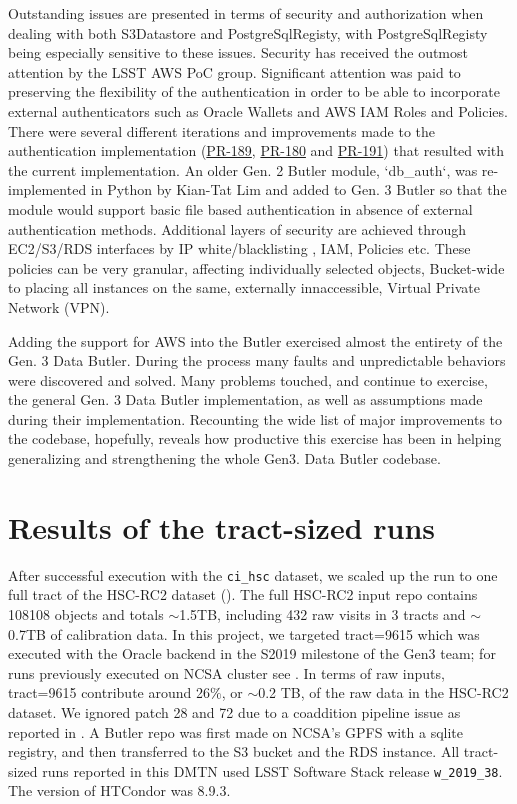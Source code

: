 Outstanding issues are presented in terms of security and authorization when dealing with both S3Datastore and PostgreSqlRegisty, with PostgreSqlRegisty being especially sensitive to these issues. Security has received the outmost attention by the LSST AWS PoC group. Significant attention was paid to preserving the flexibility of the authentication in order to be able to incorporate external authenticators such as Oracle Wallets and AWS IAM Roles and Policies. There were several different iterations and improvements made to the authentication implementation (\href{https://github.com/lsst/daf_butler/pull/189}{PR-189}, \href{https://github.com/lsst/daf_butler/pull/180}{PR-180} and \href{https://github.com/lsst/daf_butler/pull/191}{PR-191}) that resulted with the current implementation. An older Gen. 2 Butler module, `db\_auth`, was re-implemented in Python by Kian-Tat Lim and added to Gen. 3 Butler so that the module would support basic file based authentication in absence of external authentication methods. Additional layers of security are achieved through EC2/S3/RDS interfaces by IP white/blacklisting , IAM, Policies etc. These policies can be very granular, affecting individually selected objects, Bucket-wide to placing all instances on the same, externally innaccessible, Virtual Private Network (VPN).

Adding the support for AWS into the Butler exercised almost the entirety of the Gen. 3 Data Butler. During the process many faults and unpredictable behaviors were discovered and solved. Many problems touched, and continue to exercise, the general Gen. 3 Data Butler implementation, as well as assumptions made during their implementation. Recounting the wide list of major improvements to the codebase, hopefully, reveals how productive this exercise has been in helping generalizing and strengthening the whole Gen3. Data Butler codebase.

\section{Results of the tract-sized runs}

After successful execution with the \texttt{ci\_hsc} dataset, we scaled up the run to one full tract of the HSC-RC2 dataset ().
The full HSC-RC2 input repo contains 108108 objects and totals $\sim$1.5TB, including 432 raw visits in 3 tracts and $\sim$0.7TB of calibration data.
In this project, we targeted tract=9615 which was executed with the Oracle backend in the S2019 milestone of the Gen3 team; for runs previously executed on NCSA cluster see .
In terms of raw inputs, tract=9615 contribute around 26$\%$, or $\sim$0.2 TB, of the raw data in the HSC-RC2 dataset.
We ignored patch 28 and 72 due to a coaddition pipeline issue as reported in .
A Butler repo was first made on NCSA's GPFS with a sqlite registry, and then transferred to the S3 bucket and the RDS instance.
All tract-sized runs reported in this DMTN used LSST Software Stack release \texttt{w\_2019\_38}.
The version of HTCondor was 8.9.3.

